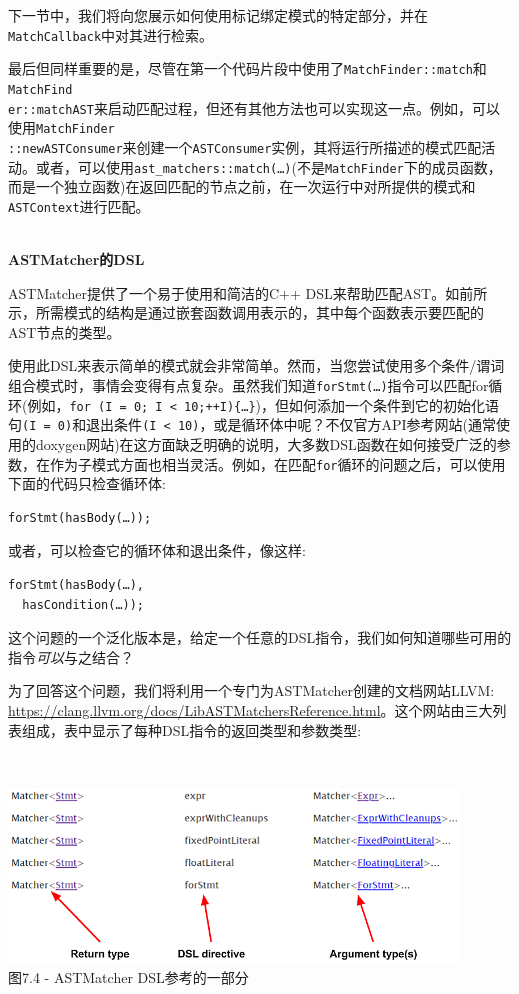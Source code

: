 下一节中，我们将向您展示如何使用标记绑定模式的特定部分，并在\texttt{MatchCallback}中对其进行检索。

最后但同样重要的是，尽管在第一个代码片段中使用了\texttt{MatchFinder::match}和\texttt{MatchFind\\er::matchAST}来启动匹配过程，但还有其他方法也可以实现这一点。例如，可以使用\texttt{MatchFinder\\::newASTConsumer}来创建一个\texttt{ASTConsumer}实例，其将运行所描述的模式匹配活动。或者，可以使用\texttt{ast\_matchers::match(…)}(不是\texttt{MatchFinder}下的成员函数，而是一个独立函数)在返回匹配的节点之前，在一次运行中对所提供的模式和\texttt{ASTContext}进行匹配。

\hspace*{\fill} \\ %
\noindent
\textbf{ASTMatcher的DSL}

ASTMatcher提供了一个易于使用和简洁的C++ DSL来帮助匹配AST。如前所示，所需模式的结构是通过嵌套函数调用表示的，其中每个函数表示要匹配的AST节点的类型。

使用此DSL来表示简单的模式就会非常简单。然而，当您尝试使用多个条件/谓词组合模式时，事情会变得有点复杂。虽然我们知道\texttt{forStmt(…)}指令可以匹配for循环(例如，\texttt{for (I = 0; I < 10;++I)\{…\}})，但如何添加一个条件到它的初始化语句\texttt{(I = 0)}和退出条件\texttt{(I < 10)}，或是循环体中呢？不仅官方API参考网站(通常使用的doxygen网站)在这方面缺乏明确的说明，大多数DSL函数在如何接受广泛的参数，在作为子模式方面也相当灵活。例如，在匹配\texttt{for}循环的问题之后，可以使用下面的代码只检查循环体:

\begin{lstlisting}[style=styleCXX]
forStmt(hasBody(…));
\end{lstlisting}

或者，可以检查它的循环体和退出条件，像这样:

\begin{lstlisting}[style=styleCXX]
forStmt(hasBody(…),
  hasCondition(…));
\end{lstlisting}

这个问题的一个泛化版本是，给定一个任意的DSL指令，我们如何知道哪些可用的指令\textit{可以}与之结合？

为了回答这个问题，我们将利用一个专门为ASTMatcher创建的文档网站LLVM: \url{https://clang.llvm.org/docs/LibASTMatchersReference.html}。这个网站由三大列表组成，表中显示了每种DSL指令的返回类型和参数类型:

\hspace*{\fill} \\ %
\begin{center}
\includegraphics[width=0.9\textwidth]{content/2/chapter7/images/4.png}\\
图7.4 - ASTMatcher DSL参考的一部分
\end{center}

